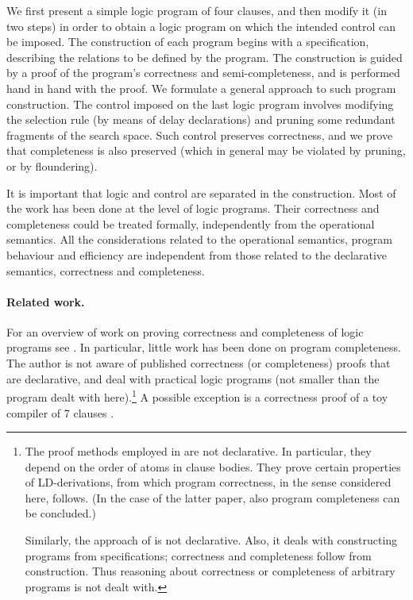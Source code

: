 \documentclass{tlp}
\begin{document}
We first present a simple logic program of four clauses, and then
modify it (in two steps) in order to obtain a logic program
on which the intended control can be imposed.
The construction of each program begins with a specification,
describing the relations to be defined by the program.
The construction is guided by a proof of the program's
correctness and semi-completeness,
and is performed hand in hand with the proof.
We formulate a general approach to such program construction.
The control imposed on the last logic program involves modifying the
selection rule (by means of delay declarations)
and pruning some redundant fragments of the search space.
Such control preserves correctness, and we
prove that completeness is also preserved
(which in general may be violated by pruning, or by floundering). 











It is important
that logic and control are separated in the construction.
Most of the work has been done at the level of logic programs.
Their correctness and completeness could be treated formally, independently
from the operational semantics.
All the considerations related to the operational semantics,
program behaviour and efficiency
 are independent from those related to the declarative
semantics, correctness and completeness.







\paragraph{Related work.}
For an overview of work on proving correctness and completeness of logic
programs see \cite{drabent.tocl16,DBLP:journals/tplp/DrabentM05shorter}.  In
particular, little work has been done on program completeness.
The author is not aware of published correctness (or completeness)
proofs that are declarative, and deal with practical logic programs
(not smaller than the program dealt with here).\footnote{\label{footnote:nondeclarative}
The proof methods employed in
  \cite{Apt-Prolog,DBLP:journals/jlp/PedreschiR99} are not declarative. 
  In particular, they depend on the order of atoms in clause bodies.
  They prove certain properties of LD-derivations, from which 
  program correctness, in the sense considered here, follows.
  (In the case of the latter paper, also program completeness
can be concluded.)

  Similarly, the approach of  is not declarative.
Also,
  it deals with constructing programs from specifications;
  correctness and completeness follow from construction.  Thus
  reasoning about correctness or completeness of arbitrary programs is not
  dealt with.  



}
A possible exception is a correctness proof of a toy compiler 
of 7 clauses \cite{Deransart.Maluszynski93}.
\end{document}
